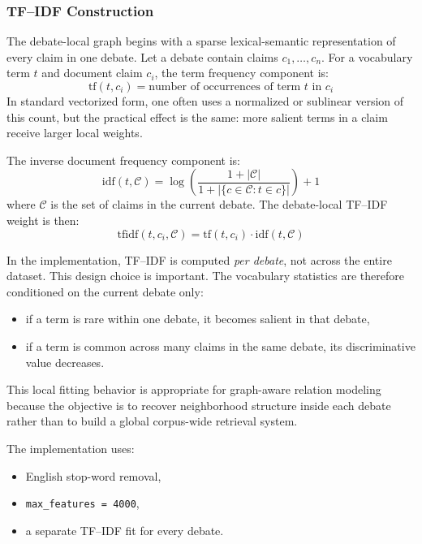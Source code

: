 \documentclass[11pt,a4paper]{article}
\begin{document}
\subsubsection{TF--IDF Construction}
The debate-local graph begins with a sparse lexical-semantic representation of every claim in one debate. Let a debate contain claims \(c_1,\dots,c_n\). For a vocabulary term \(t\) and document claim \(c_i\), the term frequency component is:
\begin{equation}
\mathrm{tf}(t,c_i) = \text{number of occurrences of term } t \text{ in } c_i
\end{equation}
In standard vectorized form, one often uses a normalized or sublinear version of this count, but the practical effect is the same: more salient terms in a claim receive larger local weights.

The inverse document frequency component is:
\begin{equation}
\mathrm{idf}(t,\mathcal{C}) = \log\left(\frac{1 + |\mathcal{C}|}{1 + |\{c \in \mathcal{C} : t \in c\}|}\right) + 1
\end{equation}
where \(\mathcal{C}\) is the set of claims in the current debate. The debate-local TF--IDF weight is then:
\begin{equation}
\mathrm{tfidf}(t,c_i,\mathcal{C}) = \mathrm{tf}(t,c_i)\cdot \mathrm{idf}(t,\mathcal{C})
\end{equation}

In the implementation, TF--IDF is computed \emph{per debate}, not across the entire dataset. This design choice is important. The vocabulary statistics are therefore conditioned on the current debate only:
\begin{itemize}[leftmargin=1.5em]
  \item if a term is rare within one debate, it becomes salient in that debate,
  \item if a term is common across many claims in the same debate, its discriminative value decreases.
\end{itemize}

This local fitting behavior is appropriate for graph-aware relation modeling because the objective is to recover neighborhood structure inside each debate rather than to build a global corpus-wide retrieval system.

The implementation uses:
\begin{itemize}[leftmargin=1.5em]
  \item English stop-word removal,
  \item \texttt{max\_features = 4000},
  \item a separate TF--IDF fit for every debate.
\end{itemize}
\end{document}
